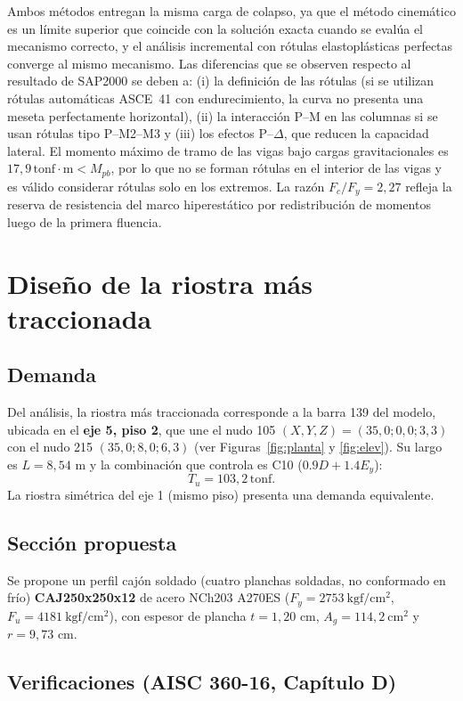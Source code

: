 \documentclass[11pt,letterpaper]{article}
\newcommand{\tonf}{\,\mathrm{tonf}}
\newcommand{\tonfm}{\,\mathrm{tonf\cdot m}}
\begin{document}
Ambos métodos entregan la misma carga de colapso, ya que el método cinemático es un límite superior que
coincide con la solución exacta cuando se evalúa el mecanismo correcto, y el análisis incremental con
rótulas elastoplásticas perfectas converge al mismo mecanismo. Las diferencias que se observen respecto al
resultado de SAP2000 se deben a: (i) la definición de las rótulas (si se utilizan rótulas automáticas
ASCE~41 con endurecimiento, la curva no presenta una meseta perfectamente horizontal), (ii) la
interacción P--M en las columnas si se usan rótulas tipo P--M2--M3 y (iii) los efectos P--$\Delta$,
que reducen la capacidad lateral. El momento máximo de tramo de las vigas bajo cargas gravitacionales es
$17{,}9\tonfm < M_{pb}$, por lo que no se forman rótulas en el interior de las vigas
y es válido considerar rótulas solo en los extremos.
La razón $F_c/F_y = 2{,}27$ refleja la reserva de resistencia del
marco hiperestático por redistribución de momentos luego de la primera fluencia.

\section{Diseño de la riostra más traccionada}

\subsection{Demanda}
Del análisis, la riostra más traccionada corresponde a la barra 139 del modelo,
ubicada en el \textbf{eje 5, piso 2}, que une el nudo 105
$(X,Y,Z) = (35{,}0;0{,}0;3{,}3)$ con el nudo 215
$(35{,}0;8{,}0;6{,}3)$ (ver Figuras~\ref{fig:planta} y \ref{fig:elev}).
Su largo es $L = 8{,}54$ m y la combinación que controla es C10 ($0.9D + 1.4E_y$):
\[
T_u = 103{,}2\tonf .
\]
La riostra simétrica del eje 1 (mismo piso) presenta una demanda equivalente.

\subsection{Sección propuesta}
Se propone un perfil cajón soldado (cuatro planchas soldadas, no conformado en frío) \textbf{CAJ250x250x12} de acero NCh203 A270ES
($F_y = 2753\ \mathrm{kgf/cm^2}$, $F_u = 4181\ \mathrm{kgf/cm^2}$), con espesor de plancha $t = 1{,}20$ cm, $A_g = 114{,}2\ \mathrm{cm^2}$ y
$r = 9{,}73$ cm.

\subsection{Verificaciones (AISC 360-16, Capítulo D)}
\end{document}
